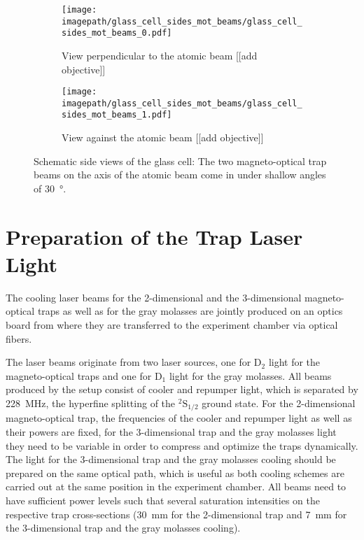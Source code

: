 \begin{figure}
    \centering
    \begin{subfigure}{0.49\textwidth}
        \centering
        \texttt{[image: \\imagepath/glass\_cell\_sides\_mot\_beams/glass\_cell\_sides\_mot\_beams\_0.pdf]}
        \caption{View perpendicular to the atomic beam [[add objective]]}\label{fig:glass_cell_sides_mot_beams_0}
    \end{subfigure}
    \begin{subfigure}{0.49\textwidth}
        \centering
        \texttt{[image: \\imagepath/glass\_cell\_sides\_mot\_beams/glass\_cell\_sides\_mot\_beams\_1.pdf]}
        \caption{View against the atomic beam [[add objective]]}\label{fig:glass_cell_sides_mot_beams_1}
    \end{subfigure}
    \caption{Schematic side views of the glass cell: The two magneto-optical trap beams on the axis of the atomic beam come in under shallow angles of \SI{30}{\degree}.
    }\label{fig:glass_cell_sides_mot_beams}
\end{figure} 

\section{Preparation of the Trap Laser Light}
The cooling laser beams for the 2-dimensional and the 3-dimensional magneto-optical traps as well as for the gray molasses are jointly produced on an optics board from where they are transferred to the experiment chamber via optical fibers.

The laser beams originate from two laser sources, one for D$_2$ light for the magneto-optical traps and one for D$_1$ light for the gray molasses. All beams produced by the setup consist of cooler and repumper light, which is separated by \SI{228}{\mega\hertz}, the hyperfine splitting of the $^2\text{S}_{1/2}$ ground state. For the 2-dimensional magneto-optical trap, the frequencies of the cooler and repumper light as well as their powers are fixed, for the 3-dimensional trap and the gray molasses light they need to be variable in order to compress and optimize the traps dynamically. The light for the 3-dimensional trap and the gray molasses cooling should be prepared on the same optical path, which is useful as both cooling schemes are carried out at the same position in the experiment chamber. All beams need to have sufficient power levels such that several saturation intensities on the respective trap cross-sections (\SI{30}{\milli\meter} for the 2-dimensional trap and \SI{7}{\milli\meter} for the 3-dimensional trap and the gray molasses cooling).

